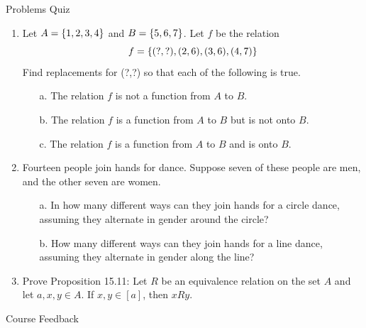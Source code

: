 \documentclass[10pt]{beamer}
\begin{document}
\begin{frame}[standout]
Problems Quiz
\end{frame}

\begin{frame}

\begin{mygreenbox}[title= \text{Problems Quiz (Equivalence Relations, Partitions, and Functions)}]
\footnotesize 
\begin{enumerate}\footnotesize 
     \item  Let $A =\{ {1,2,3,4} \}$ and $B=\{ {5,6,7} \}$.  Let $f$ be the relation
	\[  f=\{ {(?,?), (2,6),(3,6), (4,7)} \}\]
	Find replacements for (?,?) so that each of the following is true.
	\begin{itemize} \footnotesize 
		\item [a.] The relation $f$ is not a function from $A$ to $B$.
		\item [b.] The relation $f$ is a function from $A$ to $B$ but is not onto $B$.
		\item [c.] The relation $f$ is a function from $A$ to $B$ and is onto $B$.
	\end{itemize}
	\item Fourteen people join hands for  dance.  Suppose seven of these people are men, and the other seven are women.
	\begin{itemize}\footnotesize 
	\item [a.]  In how many different ways can they join hands for a circle dance, assuming they alternate in gender around the circle?
	\item [b.] How many different ways can they join hands for a line dance, assuming they alternate in gender along the line?
	\end{itemize}
	\item Prove Proposition 15.11:  Let $R$ be an equivalence relation on the set $A$ and let $a,x,y \in A$. If $x,y \in [a]$, then $xRy$.
	\end{enumerate}
\end{mygreenbox}
	
\end{frame}


\begin{frame}[standout]
Course Feedback
\end{frame}
\end{document}
